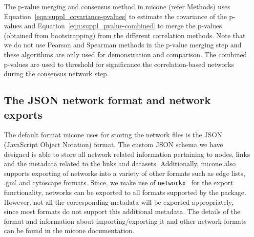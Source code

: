   The p-value merging and consensus method in \ac{micone} (refer Methods) uses Equation~\ref{eqn:suppl_covariance-pvalues} to estimate the covariance of the p-values and Equation~\ref{eqn:suppl_pvalue-combined} to merge the p-values (obtained from bootstrapping) from the different correlation methods.
  Note that we do not use Pearson and Spearman methods in the p-value merging step and these algorithms are only used for demonstration and comparison.
  The combined p-values are used to threshold for significance the correlation-based networks during the consensus network step.

  \subsection*{The JSON network format and network exports}

    The default format \ac{micone} uses for storing the network files is the JSON (JavaScript Object Notation) format.
    The custom JSON schema we have designed is able to store all network related information pertaining to nodes, links and the metadata related to the links and datasets.
    Additionally, \ac{micone} also supports exporting of networks into a variety of other formats such as edge lists, .gml and cytoscape formats.
    Since, we make use of \texttt{networkx}~\cite{hagbergExploringNetworkStructure2008} for the export functionality, networks can be exported to all formats supported by the package.
    However, not all the corresponding metadata will be exported appropriately, since most formats do not support this additional metadata.
    The details of the format and information about importing/exporting it and other network formats can be found in the \ac{micone} documentation.
